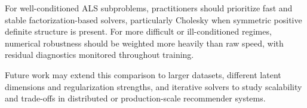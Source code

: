 \documentclass[12pt,a4paper]{report}
\begin{document}
For well-conditioned ALS subproblems, practitioners should prioritize fast and stable factorization-based solvers, particularly Cholesky when symmetric positive definite structure is present. For more difficult or ill-conditioned regimes, numerical robustness should be weighted more heavily than raw speed, with residual diagnostics monitored throughout training.

Future work may extend this comparison to larger datasets, different latent dimensions and regularization strengths, and iterative solvers to study scalability and trade-offs in distributed or production-scale recommender systems.
\newpage

\printbibliography[title={REFERENCES}]
\markboth{}{}

\end{document}
